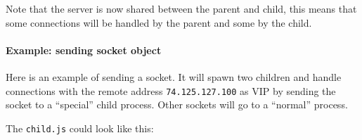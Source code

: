 Note that the server is now shared between the parent and child, this
means that some connections will be handled by the parent and some by
the child.

\paragraph{Example: sending socket object}

Here is an example of sending a socket. It will spawn two children and
handle connections with the remote address \texttt{74.125.127.100} as
VIP by sending the socket to a ``special'' child process. Other sockets
will go to a ``normal'' process.

\begin{Shaded}
\begin{Highlighting}[]
 \NormalTok{(}\NormalTok{, [}\NormalTok{]);}
 \NormalTok{(}\NormalTok{, [}\NormalTok{]);}

 \NormalTok{();}
\NormalTok{(}\NormalTok{, } 

   \NormalTok{(} \NormalTok{=== }\NormalTok{) \{}
    \NormalTok{(}
    \NormalTok{;}
  \NormalTok{\}}
  \NormalTok{(}
\NormalTok{\});}
\NormalTok{(}\NormalTok{);}
\end{Highlighting}
\end{Shaded}

The \texttt{child.js} could look like this:

\begin{Shaded}
\begin{Highlighting}[]
\NormalTok{(}\NormalTok{, }
   \NormalTok{) \{}
    \NormalTok{(} \NormalTok{+ }\NormalTok{[}\NormalTok{] + }\NormalTok{);}
  \NormalTok{\}}
\NormalTok{\});}
\end{Highlighting}
\end{Shaded}


